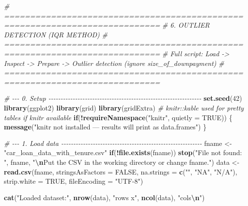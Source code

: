 \documentclass[
]{article}
\newenvironment{Shaded}{\begin{snugshade}}{\end{snugshade}}
\newcommand{\AttributeTok}[1]{\textcolor[rgb]{0.13,0.29,0.53}{#1}}
\newcommand{\CommentTok}[1]{\textcolor[rgb]{0.56,0.35,0.01}{\textit{#1}}}
\newcommand{\ConstantTok}[1]{\textcolor[rgb]{0.56,0.35,0.01}{#1}}
\newcommand{\ControlFlowTok}[1]{\textcolor[rgb]{0.13,0.29,0.53}{\textbf{#1}}}
\newcommand{\DecValTok}[1]{\textcolor[rgb]{0.00,0.00,0.81}{#1}}
\newcommand{\FunctionTok}[1]{\textcolor[rgb]{0.13,0.29,0.53}{\textbf{#1}}}
\newcommand{\NormalTok}[1]{#1}
\newcommand{\OtherTok}[1]{\textcolor[rgb]{0.56,0.35,0.01}{#1}}
\newcommand{\SpecialCharTok}[1]{\textcolor[rgb]{0.81,0.36,0.00}{\textbf{#1}}}
\newcommand{\StringTok}[1]{\textcolor[rgb]{0.31,0.60,0.02}{#1}}
\begin{document}
\begin{Shaded}
\begin{Highlighting}[]
\CommentTok{\# ============================================================================}
\CommentTok{\# 6. OUTLIER DETECTION (IQR METHOD)}
\CommentTok{\# ============================================================================}
\CommentTok{\# Full script: Load {-}\textgreater{} Inspect {-}\textgreater{} Prepare {-}\textgreater{} Outlier detection (ignore size\_of\_downpayment)}
\CommentTok{\# ============================================================================}

\CommentTok{\# {-}{-}{-} 0. Setup {-}{-}{-}{-}{-}{-}{-}{-}{-}{-}{-}{-}{-}{-}{-}{-}{-}{-}{-}{-}{-}{-}{-}{-}{-}{-}{-}{-}{-}{-}{-}{-}{-}{-}{-}{-}{-}{-}{-}{-}{-}{-}{-}{-}{-}{-}{-}{-}{-}{-}{-}{-}{-}{-}{-}{-}{-}{-}{-}{-}{-}{-}{-}}
\FunctionTok{set.seed}\NormalTok{(}\DecValTok{42}\NormalTok{)}
\FunctionTok{library}\NormalTok{(ggplot2)}
\FunctionTok{library}\NormalTok{(grid)}
\FunctionTok{library}\NormalTok{(gridExtra)}
\CommentTok{\# knitr::kable used for pretty tables if knitr available}
\ControlFlowTok{if}\NormalTok{(}\SpecialCharTok{!}\FunctionTok{requireNamespace}\NormalTok{(}\StringTok{"knitr"}\NormalTok{, }\AttributeTok{quietly =} \ConstantTok{TRUE}\NormalTok{)) \{}
  \FunctionTok{message}\NormalTok{(}\StringTok{"knitr not installed — results will print as data.frames"}\NormalTok{)}
\NormalTok{\}}

\CommentTok{\# {-}{-}{-} 1. Load data {-}{-}{-}{-}{-}{-}{-}{-}{-}{-}{-}{-}{-}{-}{-}{-}{-}{-}{-}{-}{-}{-}{-}{-}{-}{-}{-}{-}{-}{-}{-}{-}{-}{-}{-}{-}{-}{-}{-}{-}{-}{-}{-}{-}{-}{-}{-}{-}{-}{-}{-}{-}{-}{-}{-}{-}{-}{-}}
\NormalTok{fname }\OtherTok{\textless{}{-}} \StringTok{"car\_loan\_data\_with\_tenure.csv"}
\ControlFlowTok{if}\NormalTok{(}\SpecialCharTok{!}\FunctionTok{file.exists}\NormalTok{(fname)) }\FunctionTok{stop}\NormalTok{(}\StringTok{"File not found: "}\NormalTok{, fname, }\StringTok{"}\SpecialCharTok{\textbackslash{}n}\StringTok{Put the CSV in the working directory or change \textquotesingle{}fname\textquotesingle{}."}\NormalTok{)}
\NormalTok{data }\OtherTok{\textless{}{-}} \FunctionTok{read.csv}\NormalTok{(fname,}
                 \AttributeTok{stringsAsFactors =} \ConstantTok{FALSE}\NormalTok{,}
                 \AttributeTok{na.strings =} \FunctionTok{c}\NormalTok{(}\StringTok{""}\NormalTok{, }\StringTok{"NA"}\NormalTok{, }\StringTok{"N/A"}\NormalTok{),}
                 \AttributeTok{strip.white =} \ConstantTok{TRUE}\NormalTok{,}
                 \AttributeTok{fileEncoding =} \StringTok{"UTF{-}8"}\NormalTok{)}

\FunctionTok{cat}\NormalTok{(}\StringTok{"Loaded dataset:"}\NormalTok{, }\FunctionTok{nrow}\NormalTok{(data), }\StringTok{"rows x"}\NormalTok{, }\FunctionTok{ncol}\NormalTok{(data), }\StringTok{"cols}\SpecialCharTok{\textbackslash{}n}\StringTok{"}\NormalTok{)}
\end{Highlighting}
\end{Shaded}
\end{document}
